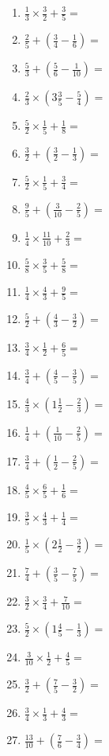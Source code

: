 \documentclass[12pt]{article}
\begin{document}
\begin{enumerate}[ itemsep=1.5cm]
	\item $\displaystyle \frac{1}{3} \times \frac{3}{2} + \frac{3}{5} =$
	\item $\displaystyle \frac{2}{5} + \left( \frac{3}{4} - \frac{1}{6} \right) =$
	\item $\displaystyle \frac{5}{3} + \left( \frac{5}{6} - \frac{1}{10} \right) =$
	\item $\displaystyle \frac{2}{3} \times \left( 3 \frac{3}{5} - \frac{5}{4} \right) =$
	\item $\displaystyle \frac{5}{2} \times \frac{1}{5} + \frac{1}{8} =$
	\item $\displaystyle \frac{3}{2} + \left( \frac{3}{2} - \frac{1}{3} \right) =$
	\item $\displaystyle \frac{5}{2} \times \frac{1}{5} + \frac{3}{4} =$
	\item $\displaystyle \frac{9}{5} + \left( \frac{3}{10} - \frac{2}{5} \right) =$
	\item $\displaystyle \frac{1}{4} \times \frac{11}{10} + \frac{2}{3} =$

	\item $\displaystyle \frac{5}{8} \times \frac{3}{5} + \frac{5}{8} =$
	\item $\displaystyle \frac{1}{4} \times \frac{4}{3} + \frac{9}{5} =$
	\item $\displaystyle \frac{5}{2} + \left( \frac{4}{3} - \frac{3}{2} \right) =$
	\item $\displaystyle \frac{3}{4} \times \frac{1}{2} + \frac{6}{5} =$
	\item $\displaystyle \frac{3}{4} + \left( \frac{4}{5} - \frac{3}{5} \right) =$
	\item $\displaystyle \frac{4}{3} \times \left( 1 \frac{1}{2} - \frac{2}{3} \right) =$
	\item $\displaystyle \frac{1}{4} + \left( \frac{1}{10} - \frac{2}{5} \right) =$
	\item $\displaystyle \frac{3}{4} + \left( \frac{1}{2} - \frac{2}{5} \right) =$
	\item $\displaystyle \frac{4}{5} \times \frac{6}{5} + \frac{1}{6} =$

	\item $\displaystyle \frac{3}{5} \times \frac{4}{3} + \frac{1}{4} =$
	\item $\displaystyle \frac{1}{5} \times \left( 2 \frac{1}{2} - \frac{3}{2} \right) =$
	\item $\displaystyle \frac{7}{4} + \left( \frac{3}{5} - \frac{7}{5} \right) =$
	\item $\displaystyle \frac{3}{2} \times \frac{3}{4} + \frac{7}{10} =$
	\item $\displaystyle \frac{5}{2} \times \left( 1 \frac{4}{5} - \frac{1}{3} \right) =$
	\item $\displaystyle \frac{3}{10} \times \frac{1}{2} + \frac{4}{5} =$
	\item $\displaystyle \frac{3}{2} + \left( \frac{7}{5} - \frac{3}{2} \right) =$
	\item $\displaystyle \frac{3}{4} \times \frac{1}{3} + \frac{4}{3} =$
	\item $\displaystyle \frac{13}{10} + \left( \frac{7}{6} - \frac{3}{4} \right) =$


\end{enumerate}
\end{document}
